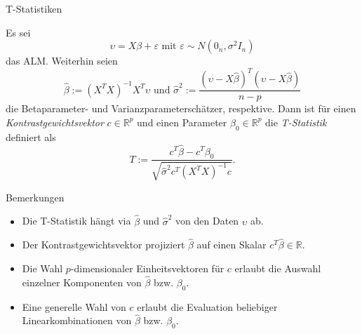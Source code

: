 \documentclass[
  8pt,
  ignorenonframetext,
]{beamer}
\providecommand{\tightlist}{%
  \setlength{\itemsep}{0pt}\setlength{\parskip}{0pt}}
\begin{document}
\begin{frame}{T-Statistiken}
\protect\hypertarget{t-statistiken}{}
\footnotesize
\begin{definition}[T-Statistik]
Es sei 
\begin{equation}
\upsilon = X\beta + \varepsilon \mbox{ mit } \varepsilon \sim N\left(0_n,\sigma^2I_n\right) 
\end{equation}
das ALM. Weiterhin seien 
\begin{equation}
\hat{\beta} := (X^TX)^{-1}X^T\upsilon \mbox{ und } \hat{\sigma}^2 := \frac{(\upsilon - X\hat{\beta})^T(\upsilon - X\hat{\beta})}{n-p} 
\end{equation}
die Betaparameter- und Varianzparameterschätzer, respektive. Dann ist für einen 
\textit{Kontrastgewichtsvektor} $c \in \mathbb{R}^p$ und einen Parameter 
$\beta_0 \in \mathbb{R}^p$ die \textit{T-Statistik} definiert als 
\begin{equation}
T := \frac{c^T\hat{\beta} - c^T\beta_0}{\sqrt{\hat{\sigma}^2c^T(X^TX)^{-1}c}}. 
\end{equation}
\end{definition}

Bemerkungen

\begin{itemize}
\tightlist
\item
  Die T-Statistik hängt via \(\hat{\beta}\) und \(\hat{\sigma}^2\) von
  den Daten \(\upsilon\) ab.
\item
  Der Kontrastgewichtsvektor projiziert \(\hat{\beta}\) auf einen Skalar
  \(c^T\hat{\beta} \in \mathbb{R}\).
\item
  Die Wahl \(p\)-dimensionaler Einheitsvektoren für \(c\) erlaubt die
  Auswahl einzelner Komponenten von \(\hat{\beta}\) bzw. \(\beta_0\).
\item
  Eine generelle Wahl von \(c\) erlaubt die Evaluation beliebiger
  Linearkombinationen von \(\hat{\beta}\) bzw. \(\beta_0\).
\end{itemize}
\end{frame}
\end{document}
